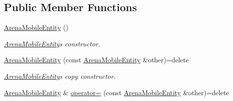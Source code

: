 \subsection*{Public Member Functions}
\begin{DoxyCompactItemize}
\item 
\hyperlink{classArenaMobileEntity_a6d038ac71d9b149052fc5a0fec4907f9}{Arena\+Mobile\+Entity} ()\hypertarget{classArenaMobileEntity_a6d038ac71d9b149052fc5a0fec4907f9}{}\label{classArenaMobileEntity_a6d038ac71d9b149052fc5a0fec4907f9}

\begin{DoxyCompactList}\small\item\em \hyperlink{classArenaMobileEntity}{Arena\+Mobile\+Entity}\textquotesingle{}s constructor. \end{DoxyCompactList}\item 
\hyperlink{classArenaMobileEntity_ad662f3efc1a56b64ecaf5633e7ff2139}{Arena\+Mobile\+Entity} (const \hyperlink{classArenaMobileEntity}{Arena\+Mobile\+Entity} \&other)=delete\hypertarget{classArenaMobileEntity_ad662f3efc1a56b64ecaf5633e7ff2139}{}\label{classArenaMobileEntity_ad662f3efc1a56b64ecaf5633e7ff2139}

\begin{DoxyCompactList}\small\item\em \hyperlink{classArenaMobileEntity}{Arena\+Mobile\+Entity}\textquotesingle{}s copy constructor. \end{DoxyCompactList}\item 
\hyperlink{classArenaMobileEntity}{Arena\+Mobile\+Entity} \& \hyperlink{classArenaMobileEntity_a34a7f0d094515cafff7611a0f6cf4eee}{operator=} (const \hyperlink{classArenaMobileEntity}{Arena\+Mobile\+Entity} \&other)=delete\hypertarget{classArenaMobileEntity_a34a7f0d094515cafff7611a0f6cf4eee}{}\label{classArenaMobileEntity_a34a7f0d094515cafff7611a0f6cf4eee}


\end{DoxyCompactItemize}
